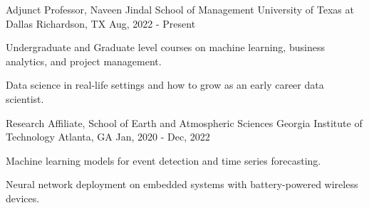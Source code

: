 

\begin{cventries}

\cventry
{Adjunct Professor, Naveen Jindal School of Management} %
{University of Texas at Dallas} %
{Richardson, TX} %
{Aug, 2022 - Present} %
{
	\begin{cvitems} %
		\item {Undergraduate and Graduate level courses on machine learning, business %
		analytics, and project management.}
		\item {Data science in real-life settings and how to grow as an early career data scientist.}
	\end{cvitems}
}

\cventry
{Research Affiliate, School of Earth and Atmospheric Sciences} %
{Georgia Institute of Technology} %
{Atlanta, GA} %
{Jan, 2020 - Dec, 2022} %
{
	\begin{cvitems} %
		\item {Machine learning models for event detection and time series forecasting.}
		\item {Neural network deployment on embedded systems with battery-powered wireless devices.}
	\end{cvitems}
}

%

\end{cventries}
